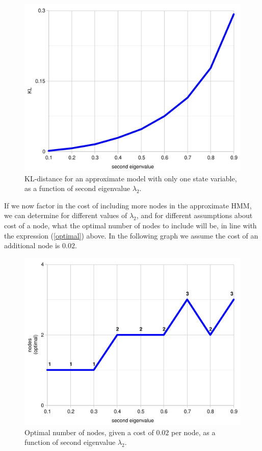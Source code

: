 \documentclass[10pt,letterpaper]{article}
\begin{document}
 \begin{figure}[h]  \begin{center}
\includegraphics[scale=0.33]{kl-eigenvalue-5.pdf} \caption{KL-distance for an approximate model with only one state variable, as a function of second eigenvalue $\lambda_2$.} \end{center} 
\label{kl-eigen}\end{figure}

If we now factor in the cost of including more nodes in the approximate HMM, we can determine for different values of $\lambda_2$, and for different assumptions about cost of a node, what the optimal number of nodes to include will be, in line with the expression (\ref{optimal}) above. In the following graph we assume the cost of an additional node is $0.02$.

 \begin{figure}[h]  \begin{center}
\includegraphics[scale=0.33]{kl-eigenvalue-6.pdf} \caption{Optimal number of nodes, given a cost of $0.02$ per node, as a function of second eigenvalue $\lambda_2$.} \end{center} 
\label{kl-eigen1}\end{figure}
\end{document}
